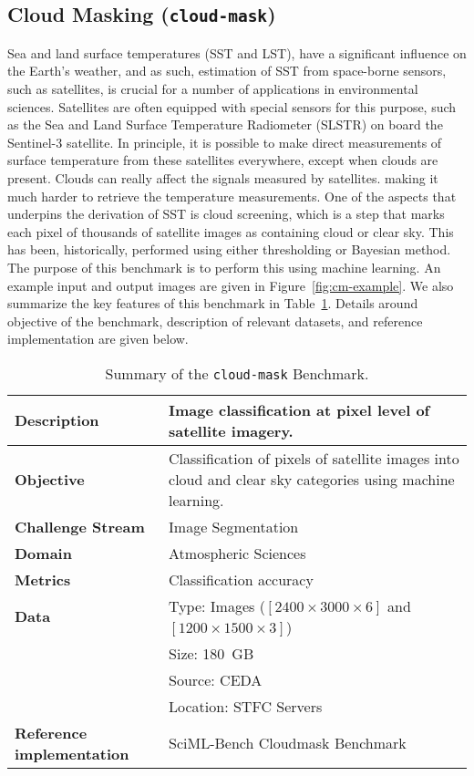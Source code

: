 \subsection{Cloud Masking ({\tt cloud-mask})}


Sea and land surface temperatures (SST and LST), have a significant
influence on the Earth's weather, and as such, estimation of SST from space-borne sensors, such as satellites, is crucial for a
number of applications in environmental sciences. Satellites are often
equipped with special sensors for this purpose, such as the Sea and Land
Surface Temperature Radiometer (SLSTR) on board the Sentinel-3 satellite. In principle, it is possible to make direct measurements of surface
temperature from these satellites everywhere, except when clouds are
present. Clouds can really affect the signals measured by satellites. making it  much harder to retrieve the temperature measurements. One of
the aspects that underpins the derivation of SST is cloud screening,
which is a step that marks each pixel of thousands of satellite images
as containing cloud or clear sky. This has been, historically, performed using either thresholding or Bayesian method. The purpose of this benchmark is to perform this using machine learning.  An example input and output images are given in Figure~\ref{fig:cm-example}. We also summarize the key features of this benchmark in Table~\ref{tab:cloudmask-seg}. Details around objective of the benchmark, description of relevant datasets, and reference implementation are given below.




\begin{small}
\begin{table}
\caption{Summary of the {\tt cloud-mask} Benchmark.}
\label{tab:cloudmask-seg}
\begin{tabular}{p{}p{}}
\hline
\hline
{\bf Description} &
Image classification at pixel level of satellite imagery.
\\
\hline
{\bf Objective} &
Classification of pixels of satellite images into cloud and clear sky categories using machine learning.
\\
\hline
{\bf Challenge Stream} & Image Segmentation\\
\hline
{\bf Domain} & Atmospheric Sciences\\
\hline
{\bf Metrics} &  Classification accuracy\\
\hline
{\bf Data} & Type: Images  ($[2400\times3000\times6]$ and $[1200\times1500\times3]$) \\
& Size: 180~GB \\
& Source: CEDA \\
& Location: STFC Servers~\cite{sciml-bench:2021}\\
\hline
{\bf Reference implementation} & SciML-Bench Cloudmask Benchmark~\cite{cloudmask-implementation} \\
\hline
\hline
\end{tabular}
\end{table}
\end{small}

